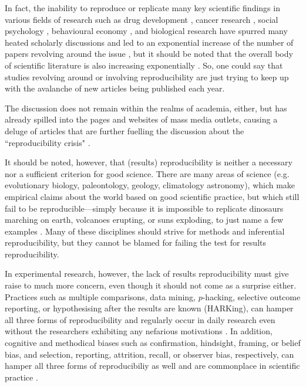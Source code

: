 \documentclass[11pt, a4paper,twoside]{report}\usepackage[]{graphicx}\usepackage[]{color}
\begin{document}
In fact, the inability to reproduce or replicate many key scientific findings in various fields of research such as drug development \citep{prinz_believe_2011,begley2012drug}, cancer research \citep{nosek_reproducibility_2017}, social psychology \citep{aarts2015estimating}, behavioural economy \citep{camerer_evaluating_2016}, and biological research \citep{freedman_economics_2015,vogt_authorization_2016} have spurred many heated scholarly discussions and led to an exponential increase of the number of papers revolving around the issue \citep{goodman_what_2016}, but it should be noted that the overall body of scientific literature is also increasing exponentially \citep{bornmann2015growth}. So, one could say that studies revolving around or involving reproducibility are just trying to keep up with the avalanche of new articles being published each year.

The discussion does not remain within the realms of academia, either, but has already spilled into the pages and websites of mass media outlets, causing a deluge of articles that are further fuelling the discussion about the ``reproducibility crisis" \citep{lehrer_truth_2010,carey_psychology_2015,carey_scrutiny_2015,achenbach_many_2015,achenbach_reproducibility_2015,yong_psychology_2016,engber_broken_2016,baker_crisis_2016,econ_try_2016,feilden_most_2017,belluz_cancer_2017,meyer_fix_2017}.

It should be noted, however, that (results) reproducibility is neither a necessary nor a sufficient criterion for good science. There are many areas of science (e.g. evolutionary biology, paleontology, geology, climatology astronomy), which make empirical claims about the world based on good scientific practice, but which still fail to be reproducible---simply because it is impossible to replicate dinosaurs marching on earth, volcanoes erupting, or suns exploding, to just name a few examples \citep{dfg_reproduzierbarkeit_2017}. Many of these disciplines should strive for methods and inferential reproducibility, but they cannot be blamed for failing the test for results reproducibility. 

In experimental research, however, the lack of results reproducibility must give raise to much more concern, even though it should not come as a surprise either. Practices such as multiple comparisons, data mining, $p$-hacking, selective outcome reporting, or hypothesising after the results are known (HARKing), can hamper all three forms of reproducibility and regularly occur in daily research even without the researchers exhibiting any nefarious motivations \citep{goodman_what_2016}. In addition, cognitive and methodical biases such as confirmation, hindsight, framing, or belief bias, and selection, reporting, attrition, recall, or observer bias, respectively, can hamper all three forms of reproducibiliy as well and are commonplace in scientific practice \citep{munafo_manifesto_2017}.
\end{document}
